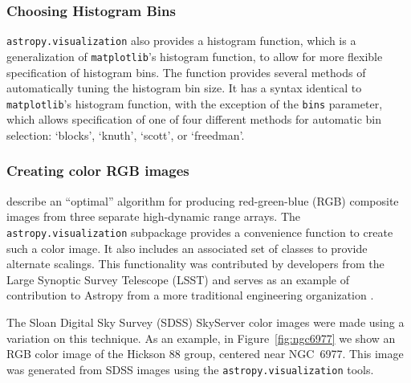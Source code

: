 \documentclass[modern]{aastex61}
\newcommand{\package}[1]{\texttt{#1}\xspace}
\newcommand{\astropy}{Astropy\xspace}
\renewcommand{\figurename}{Figure\xspace}
\begin{document}
\subsubsection{Choosing Histogram Bins}

\package{astropy.visualization} also provides a histogram function, which is a
generalization of \texttt{matplotlib}’s histogram function, to allow for more
flexible specification of histogram bins.  The function provides several methods
of automatically tuning the histogram bin size. It has a syntax identical to
\texttt{matplotlib}’s histogram function, with the exception of the \texttt{bins}
parameter, which allows specification of one of four different methods for
automatic bin selection: `blocks', `knuth', `scott', or `freedman'.

\subsubsection{Creating color RGB images}

\cite{Lupton2004} describe an ``optimal'' algorithm for producing red-green-blue (RGB) composite images from three separate high-dynamic range arrays. The \package{astropy.visualization} subpackage provides a convenience function to create such a color image.  It also includes an associated set of classes to provide alternate scalings.
This functionality was contributed by developers from the Large Synoptic Survey Telescope (LSST) and serves as an example of contribution to \astropy from a more traditional engineering organization \citep{Jennes2016}.

The Sloan Digital Sky Survey (SDSS) SkyServer color images were made using a variation on this technique.  As an example, in \figurename~\ref{fig:ngc6977} we show an RGB color image of the Hickson 88 group, centered near NGC~6977.  This image was generated from SDSS images using the \package{astropy.visualization} tools.
\end{document}

